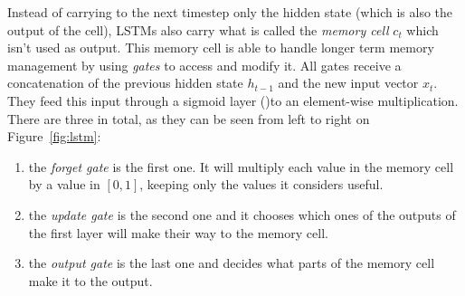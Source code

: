 Instead of carrying to the next timestep only the hidden state (which is also
the output of the cell), LSTMs also carry what is called the
\textit{memory cell} $c_t$ which isn't used as output. This memory cell is 
able to handle longer term memory management by using \textit{gates} to 
access and modify it. All gates receive a concatenation of the previous hidden
state $h_{t-1}$ and the new input vector $x_t$. They feed this input through a
sigmoid layer ()to an element-wise multiplication. There are 
three in total, as they can be seen from left to right on Figure~\ref{fig:lstm}:
\begin{enumerate}
	\item the \textit{forget gate} is the first one. It will multiply each
		value in the memory cell by a value in $[0, 1]$, keeping only
		the values it considers useful.
	\item the \textit{update gate} is the second one and it chooses which
		ones of the outputs of the first  layer will
		make their way to the memory cell.
	\item the \textit{output gate} is the last one and decides what parts
		of the memory cell make it to the output.
\end{enumerate}



